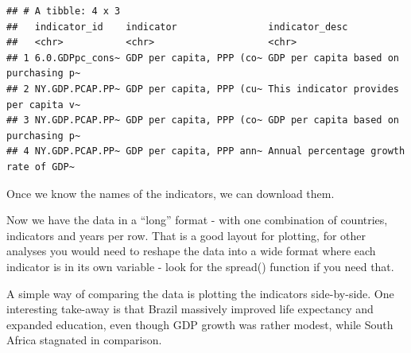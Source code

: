 \documentclass[
]{book}
\newenvironment{Shaded}{\begin{snugshade}}{\end{snugshade}}
\newcommand{\CommentTok}[1]{\textcolor[rgb]{0.56,0.35,0.01}{\textit{#1}}}
\newcommand{\DataTypeTok}[1]{\textcolor[rgb]{0.13,0.29,0.53}{#1}}
\newcommand{\KeywordTok}[1]{\textcolor[rgb]{0.13,0.29,0.53}{\textbf{#1}}}
\newcommand{\NormalTok}[1]{#1}
\newcommand{\OtherTok}[1]{\textcolor[rgb]{0.56,0.35,0.01}{#1}}
\newcommand{\StringTok}[1]{\textcolor[rgb]{0.31,0.60,0.02}{#1}}
\begin{document}
\begin{verbatim}
## # A tibble: 4 x 3
##   indicator_id    indicator                indicator_desc                       
##   <chr>           <chr>                    <chr>                                
## 1 6.0.GDPpc_cons~ GDP per capita, PPP (co~ GDP per capita based on purchasing p~
## 2 NY.GDP.PCAP.PP~ GDP per capita, PPP (cu~ This indicator provides per capita v~
## 3 NY.GDP.PCAP.PP~ GDP per capita, PPP (co~ GDP per capita based on purchasing p~
## 4 NY.GDP.PCAP.PP~ GDP per capita, PPP ann~ Annual percentage growth rate of GDP~
\end{verbatim}

Once we know the names of the indicators, we can download them.

\begin{Shaded}
\end{Shaded}

Now we have the data in a ``long'' format - with one combination of countries, indicators and years per row. That is a good layout for plotting, for other analyses you would need to reshape the data into a wide format where each indicator is in its own variable - look for the spread() function if you need that.

A simple way of comparing the data is plotting the indicators side-by-side. One interesting take-away is that Brazil massively improved life expectancy and expanded education, even though GDP growth was rather modest, while South Africa stagnated in comparison.
\end{document}
